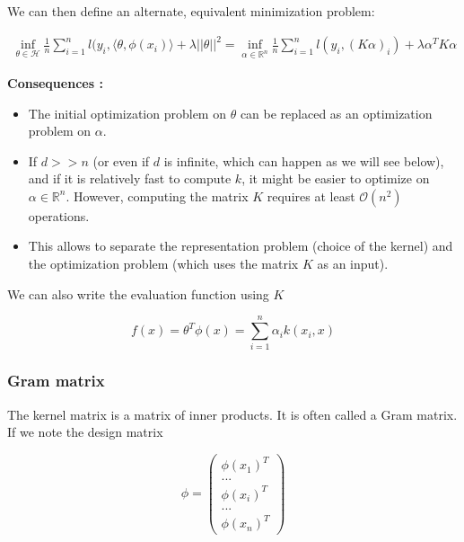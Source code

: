\documentclass[
10pt, %
a4paper, %
oneside, %
headinclude,footinclude, %
BCOR5mm, %
]{scrartcl}
\begin{document}
We can then define an alternate, equivalent minimization problem:

    \begin{equation}
	\begin{aligned}
	    \label{eq:}
	\inf_{ \theta\in \mathcal{H} } \frac{1}{n} \sum^{n}_{i=1} l(y_i, \langle\theta,\phi(x_i)\rangle+\lambda ||\theta||^2= \inf_{ \alpha\in \mathbb{R}^n} \frac{1}{n} \sum^{n}_{i=1} l(y_i, (K\alpha)_i)+\lambda \alpha^TK\alpha
	\end{aligned}
    \end{equation}

\textbf{{Consequences :}}
\begin{itemize}
    \item The initial optimization problem on $\theta$ can be replaced as an optimization problem on $\alpha$.
    \item If $d>>n$ (or even if $d$ is infinite, which can happen as we will see below), and if it is relatively fast to compute $k$, it might be easier to optimize on $\alpha \in \mathbb{R}^n$.  However, computing the matrix $K$ requires at least $ \mathcal{O} (n^2)$ operations.
    \item This allows to separate the representation problem (choice of the kernel) and the optimization problem (which uses the matrix $K$ as an input).
\end{itemize}

We can also write the evaluation function using $K$

\begin{equation}
    f(x) = \theta^T\phi(x) = \sum^{n}_{i=1} \alpha_ik(x_i,x)
\end{equation}


\subsubsection{\large\color{Periwinkle}Gram matrix}

The kernel matrix is a matrix of inner products. It is often called a Gram matrix. If we note the design matrix 

\begin{equation*}
\phi=
\begin{pmatrix}
    \phi(x_{1})^T\\
...\\
    \phi(x_{i})^T\\
...\\
    \phi(x_{n})^T
\end{pmatrix}
\end{equation*}
\end{document}
